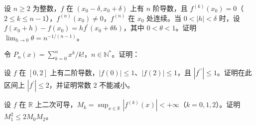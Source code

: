 \noindent\begin{minipage}{\textwidth}
设 $n\ge2$ 为整数，$f$ 在 $(x_0-\delta,x_0+\delta)$ 上有 $n$ 阶导数，且 $f^{(k)}(x_0)=0$（$2\le k\le n-1$），$f^{(n)}(x_0)\ne0$，$f^{(n)}$ 在 $x_0$ 处连续。当 $0<|h|<\delta$ 时，设 $f(x_0+h)-f(x_0)=hf^{\prime}(x_0+\theta h)$，其中 $0<\theta<1$。证明 $\lim_{h\to0}\theta=n^{-1/(n-1)}$。
\end{minipage}\par\vfill
\noindent\begin{minipage}{\textwidth}
令 $P_n(x)=\sum_{k=0}^n x^k/k!$，$n\in\mathbb N^*$。证明：
\end{minipage}\par\vfill
\newpage
\noindent\begin{minipage}{\textwidth}
设 $f$ 在 $[0,2]$ 上有二阶导数，$|f(0)|\le1$、$|f(2)|\le1$，且 $|f^{\prime\prime}|\le1$。证明在此区间上 $|f^{\prime}|\le2$，并证明常数 $2$ 不能减小。
\end{minipage}\par\vfill
\noindent\begin{minipage}{\textwidth}
设 $f$ 在 $\mathbb R$ 上二次可导，$M_k=\sup_{x\in\mathbb R}|f^{(k)}(x)|<+\infty$（$k=0,1,2$）。证明 $M_1^2\le2M_0M_2$。
\end{minipage}\par\vfill
